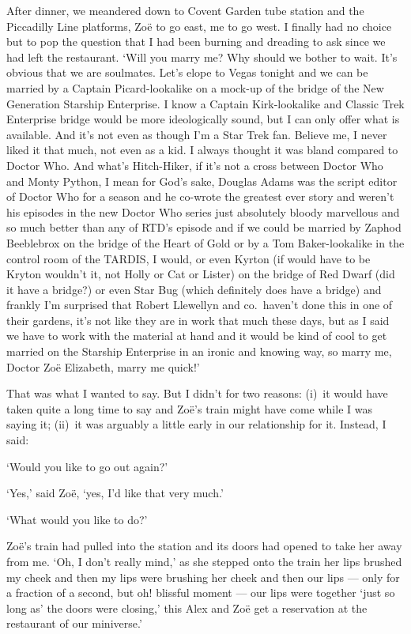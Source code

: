 After dinner, we meandered down to Covent Garden tube station and
the Piccadilly Line platforms, Zoë to go east, me to go west. I
finally had no choice but to pop the question that I had been
burning and dreading to ask since we had left the restaurant. `Will
you marry me? Why should we bother to wait. It's obvious that we are
soulmates. Let's elope to Vegas tonight and we can be married by a
Captain Picard-lookalike on a mock-up of the bridge of the
{\twelvesl New Generation\/} Starship {\twelvesl Enterprise}. I know
a Captain Kirk-lookalike and Classic {\twelvesl Trek\/} {\twelvesl
Enterprise\/} bridge would be more ideologically sound, but I can
only offer what is available. And it's not even as though I'm a
{\twelvesl Star Trek\/} fan. Believe me, I never liked it that much,
not even as a kid. I always thought it was bland compared to
{\twelvesl Doctor Who}. And what's {\twelvesl Hitch-Hiker\/}, if
it's not a cross between {\twelvesl Doctor Who\/} and {\twelvesl
Monty Python\/}, I mean for God's sake, Douglas Adams was the script
editor of {\twelvesl Doctor Who\/} for a season and he co-wrote the
greatest ever story and weren't his episodes in the new {\twelvesl
Doctor Who\/} series just absolutely bloody marvellous and so much
better than any of RTD's episode and if we could be married by
Zaphod Beeblebrox on the bridge of the {\twelvesl Heart of Gold\/}
or by a Tom Baker-lookalike in the control room of the TARDIS, I
would, or even Kyrton (if would have to be Kryton wouldn't it, not
Holly or Cat or Lister) on the bridge of {\twelvesl Red Dwarf} (did
it have a bridge?) or even {\twelvesl Star Bug} (which definitely
does have a bridge) and frankly I'm surprised that Robert Llewellyn
and co.~haven't done this in one of their gardens, it's not like
they are in work that much these days, but as I said we have to work
with the material at hand and it would be kind of cool to get
married on the Starship {\twelvesl Enterprise\/} in an ironic and
knowing way, so marry me, Doctor Zoë Elizabeth, marry me quick!'

That was what I wanted to say. But I didn't for two reasons: (i)~it
would have taken quite a long time to say and Zoë's train might
have come while I was saying it; (ii)~it was arguably a {\twelveit
little\/} early in our relationship for it. Instead, I said:

`Would you like to go out again?'

`Yes,' said Zoë, `yes, I'd like that very much.'

`What would you like to do?'

Zoë's train had pulled into the station and its doors had opened
to take her away from me. `Oh, I don't really mind,' as she stepped
onto the train her lips brushed my cheek and then my lips were
brushing her cheek and then our lips --- only for a fraction of a
second, but oh! blissful moment --- our lips were together `just so
long as' the doors were closing,' this Alex and Zoë get a
reservation at the restaurant of our miniverse.'
\vfill\eject
